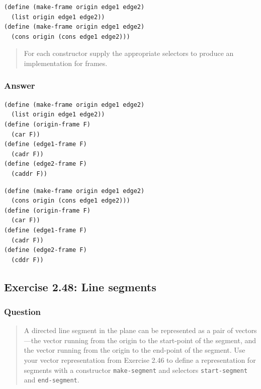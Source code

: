 \documentclass[final,fleqn,titlepage,twoside]{article}
\begin{document}
\begin{verbatim}
(define (make-frame origin edge1 edge2)
  (list origin edge1 edge2))
(define (make-frame origin edge1 edge2)
  (cons origin (cons edge1 edge2)))
\end{verbatim}

\begin{quote}
For each constructor supply the appropriate selectors to produce an
implementation for frames.
\end{quote}

\subsubsection{Answer}
\label{sec:org801ebde}
\begin{verbatim}
(define (make-frame origin edge1 edge2)
  (list origin edge1 edge2))
(define (origin-frame F)
  (car F))
(define (edge1-frame F)
  (cadr F))
(define (edge2-frame F)
  (caddr F))
\end{verbatim}
\begin{verbatim}
(define (make-frame origin edge1 edge2)
  (cons origin (cons edge1 edge2)))
(define (origin-frame F)
  (car F))
(define (edge1-frame F)
  (cadr F))
(define (edge2-frame F)
  (cddr F))
\end{verbatim}

\subsection{Exercise 2.48: Line segments}
\label{sec:org9765d28}
\subsubsection{Question}
\label{sec:orge443a4b}
\begin{quote}
A directed line segment in the plane can be represented as a pair of
vectors---the vector running from the origin to the start-point of the segment,
and the vector running from the origin to the end-point of the segment. Use your
vector representation from Exercise 2.46 to define a
representation for segments with a constructor \texttt{make-segment} and
selectors \texttt{start-segment} and \texttt{end-segment}.
\end{quote}
\end{document}
